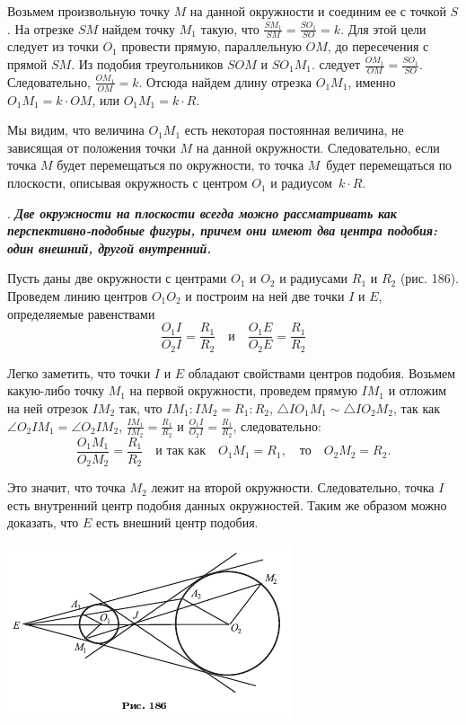 \documentclass[oneside]{book}
\begin{document}
Возьмем произвольную точку $M$ на данной окружности и соединим ее с точкой $S$.
На отрезке $SM$ найдем точку $M_1$ такую, что $\frac{SM_1}{SM}=\frac{SO_1}{SO}= k$.
Для этой цели следует из точки $O_1$ провести прямую, параллельную $OM$, до пересечения с прямой $SM$.
Из подобия треугольников $SOM$ и $SO_1M_1$.
следует $\frac{OM_1}{OM}=\frac{SO_1}{SO}$.
Следовательно, $\frac{OM_1}{OM}=k$.
Отсюда найдем длину отрезка $O_1M_1$, именно $O_1M_1=k\cdot OM$, или $O_1M_1=k\cdot R$.

Мы видим, что величина $O_1M_1$ есть некоторая постоянная величина, не зависящая от положения точки $M$ на данной окружности.
Следовательно, если точка $M$ будет перемещаться по окружности, то точка $M$\ будет перемещаться по плоскости, описывая окружность с центром $O_1$ и радиусом~$k\cdot R$.

.
\textbf{\emph{Две окружности на плоскости всегда можно рассматривать как перспективно-подобные фигуры, причем они имеют два центра подобия:
один внешний, другой внутренний.}} %

Пусть даны две окружности с центрами $O_1$ и $O_2$ и радиусами $R_1$ и $R_2$ (рис. 186).
Проведем линию центров $O_1O_2$ и построим на ней две точки $I$ и $E$, определяемые равенствами
\[\frac{O_1I}{O_2I}=\frac{R_1}{R_2}\quad\text{и}\quad\frac{O_1E}{O_2E}=\frac{R_1}{R_2}\]

Легко заметить, что точки $I$ и $E$ обладают свойствами центров подобия.
Возьмем какую-либо точку $M_1$ на первой окружности, проведем прямую $IM_1$ и отложим на ней отрезок $IM_2$ так, что $IM_1:IM_2=R_1:R_2$, 
$\triangle IO_1M_1\sim\triangle IO_2M_2$, так как $\angle O_2IM_1=\angle O_2IM_2$, $\frac{IM_1}{IM_2}=\frac{R_1}{R_2}$ и $\frac{O_1I}{O_2I}=\frac{R_1}{R_2}$, следовательно:
\[\frac{O_1M_1}{O_2M_2}=\frac{R_1}{R_2}\quad\text{и так как}\quad O_1M_1=R_1,\quad\text{то}\quad O_2M_2=R_2.\]

Это значит, что точка $M_2$ лежит на второй окружности.
Следовательно, точка $I$ есть внутренний центр подобия данных окружностей.
Таким же образом можно доказать, что $E$ есть внешний центр подобия.

\includegraphics{pics/ris-186} %
\end{document}
